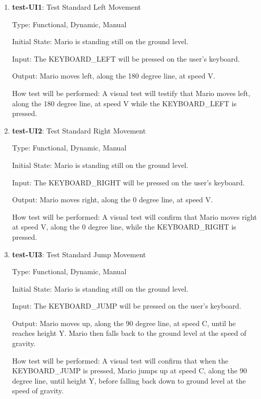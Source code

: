 \documentclass[12pt, titlepage]{article}
\begin{document}
\begin{enumerate}

\item{\textbf{test-UI1}: Test Standard Left Movement\\}

Type: Functional, Dynamic, Manual
					
Initial State: Mario is standing still on the ground level. 
					
Input: The KEYBOARD\_LEFT will be pressed on the user's keyboard.
					
Output: Mario moves left, along the 180 degree line, at speed V.
					
How test will be performed: A visual test will testify that Mario moves left, along the 180 degree line, at speed V while the KEYBOARD\_LEFT is pressed.
					
\item{\textbf{test-UI2}: Test Standard Right Movement\\}

Type: Functional, Dynamic, Manual
					
Initial State: Mario is standing still on the ground level.
					
Input: The KEYBOARD\_RIGHT will be pressed on the user's keyboard.
					
Output: Mario moves right, along the 0 degree line, at speed V.
					
How test will be performed: A visual test will confirm that Mario moves right at speed V, along the 0 degree line, while the KEYBOARD\_RIGHT is pressed.

\item{\textbf{test-UI3}: Test Standard Jump Movement\\}

Type: Functional, Dynamic, Manual
					
Initial State: Mario is standing still on the ground level.
					
Input: The KEYBOARD\_JUMP will be pressed on the user's keyboard.
					
Output: Mario moves up, along the 90 degree line, at speed C, until he reaches height Y. Mario then falls back to the ground level at the speed of gravity.
					
How test will be performed: A visual test will confirm that when the KEYBOARD\_JUMP is pressed, Mario jumps up at speed C, along the 90 degree line, until height Y, before falling back down to ground level at the speed of gravity.


\end{enumerate}
\end{document}
